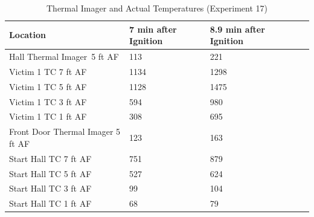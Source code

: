 \documentclass[12pt,oneside]{book}
\begin{document}
\begin{table}[H]
\centering
\begin{tabular}{|L{0.25\textwidth}|C{0.15\textwidth}|C{0.15\textwidth}|C{0.15\textwidth}|C{0.15\textwidth}|}
\hline
Location	                    &7 min after Ignition	&8.9 min after Ignition \\ \hline \hline
Hall Thermal Imager~5 ft AF 	&113	&221	\\ \hline
Victim 1 TC 7 ft AF				&1134	&1298	\\ \hline
Victim 1 TC 5 ft AF				&1128	&1475	\\ \hline
Victim 1 TC 3 ft AF				&594	&980	\\ \hline
Victim 1 TC 1 ft AF				&308	&695	\\ \hline
Front Door Thermal Imager 5 ft AF &123	&163	\\ \hline
Start Hall TC 7 ft AF			&751	&879	\\ \hline
Start Hall TC 5 ft AF			&527	&624	\\ \hline
Start Hall TC 3 ft AF			&99		&104	\\ \hline
Start Hall TC 1 ft AF			&68		&79		\\ \hline
\end{tabular}
\caption{Thermal Imager and Actual Temperatures (Experiment 17)}
\label{table:hall_thermal_imager_17}
\end{table}
\end{document}
